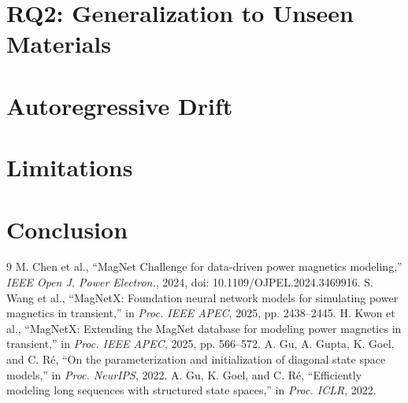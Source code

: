 \documentclass[journal]{IEEEtran}
\begin{document}
\section{RQ2: Generalization to Unseen Materials}

\section{Autoregressive Drift}

\section{Limitations}

\section{Conclusion}


\begin{thebibliography}{9}
M. Chen et al., ``MagNet Challenge for data-driven power magnetics modeling,''
\emph{IEEE Open J. Power Electron.}, 2024, doi: 10.1109/OJPEL.2024.3469916.
S. Wang et al., ``MagNetX: Foundation neural network models for simulating power
magnetics in transient,'' in \emph{Proc. IEEE APEC}, 2025, pp. 2438--2445.
H. Kwon et al., ``MagNetX: Extending the MagNet database for modeling power
magnetics in transient,'' in \emph{Proc. IEEE APEC}, 2025, pp. 566--572.
A. Gu, A. Gupta, K. Goel, and C. R\'e, ``On the parameterization and initialization of
diagonal state space models,'' in \emph{Proc. NeurIPS}, 2022.
A. Gu, K. Goel, and C. R\'e, ``Efficiently modeling long sequences with structured state
spaces,'' in \emph{Proc. ICLR}, 2022.
\end{thebibliography}
\end{document}
